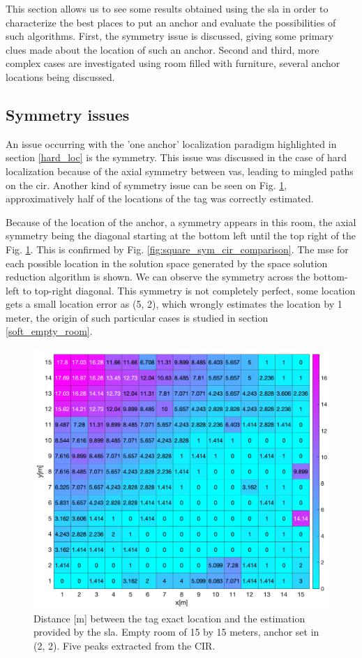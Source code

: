 This section allows us to see some results obtained using the \gls{sla} in order to characterize the best places to put an anchor and evaluate the possibilities of such algorithms. First, the symmetry issue is discussed, giving some primary clues made about the location of such an anchor. Second and third, more complex cases are investigated using room filled with furniture, several anchor locations being discussed.

\subsection{Symmetry issues}
\label{sym_cases}

An issue occurring with the 'one anchor' localization paradigm highlighted in section \ref{hard_loc} is the symmetry. This issue was discussed in the case of hard localization because of the axial symmetry between \glspl{va}, leading to mingled paths on the \gls{cir}. Another kind of symmetry issue can be seen on Fig. \ref{fig:square_sym}, approximatively half of the locations of the tag was correctly estimated.
\vspace{2mm}

Because of the location of the anchor, a symmetry appears in this room, the axial symmetry being the diagonal starting at the bottom left until the top right of the Fig. \ref{fig:square_sym}. This is confirmed by Fig. \ref{fig:square_sym_cir_comparison}. The \gls{mse} for each possible location in the solution space generated by the space solution reduction algorithm is shown. We can observe the symmetry across the bottom-left to top-right diagonal. This symmetry is not completely perfect, some location gets a small location error as (5, 2), which wrongly estimates the location by 1 meter, the origin of such particular cases is studied in section \ref{soft_empty_room}.

\begin{figure}[H]
\centering
\includegraphics[width=.7\linewidth]{Images/15_15_sym.png}
\caption{Distance [m] between the tag exact location and the estimation provided by the \gls{sla}. Empty room of 15 by 15 meters, anchor set in (2, 2). Five peaks extracted from the CIR. \label{fig:square_sym}}
\end{figure}


